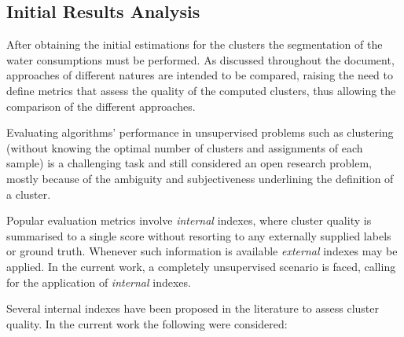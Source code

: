 \documentclass[9pt,journal,compsoc]{IEEEtran}
\begin{document}
\subsection{Initial Results Analysis}

After obtaining the initial estimations for the clusters the segmentation of the water consumptions must be performed. As discussed throughout the document, approaches of different natures are intended to be compared, raising the need to define metrics that assess the quality of the computed clusters, thus allowing the comparison of the different approaches.

Evaluating algorithms' performance in unsupervised problems such as clustering (without knowing the optimal number of clusters and assignments of each sample) is a challenging task and still considered an open research problem\cite{aghabozorgi2015time}, mostly because of the ambiguity and subjectiveness underlining the definition of a cluster.

Popular evaluation metrics involve \emph{internal} indexes, where cluster quality is summarised to a single score without resorting to any externally supplied labels or ground truth. Whenever such information is available \emph{external} indexes may be applied. In the current work, a completely unsupervised scenario is faced, calling for the application of \emph{internal} indexes.

Several internal indexes have been proposed in the literature to assess cluster quality. In the current work the following were considered:
\end{document}
